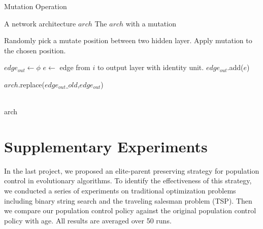 \documentclass{article}
\begin{document}
\begin{normalsize}
  \begin{algorithm}[H]  
     \caption{ Mutation Operation}
  
 
     \begin{algorithmic}[1]  
     \Require A network architecture $arch$
     \Ensure The $arch$ with a mutation
     
     
         \State Randomly pick a mutate position between two hidden layer.
         \State Apply mutation to the chosen position. 
     \EndWhile
     
     \State $edge_{out} \gets \phi$
       \State $e \gets$ edge from $i$ to output layer with identity unit.
       \State $edge_{out}$.add($e$)
     \EndFor
 
     \State $arch$.replace($edge_{out}\_old$,$edge_{out}$)
 
     \\
     \Return arch
     \end{algorithmic}  
 \end{algorithm}  

 \section{Supplementary Experiments}
 In the last project, we proposed an elite-parent preserving strategy for population control in evolutionary algorithms. To identify the effectiveness of this strategy, we conducted a series of experiments on traditional optimization problems including binary string search and the traveling salesman problem (TSP). Then we compare our population control policy against the original population control policy with age\cite{zhu2019eena}. All results are averaged over 50 runs.


\end{normalsize}
\end{document}
